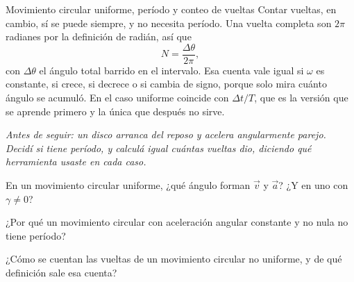 \documentclass[11pt,openany]{book}
\begin{document}
\begin{bloque}{Movimiento circular uniforme, período y conteo de vueltas}
Contar vueltas, en cambio, sí se puede siempre, y no necesita período. Una vuelta completa son $2\pi$ radianes por la definición de radián, así que
\[
N = \frac{\Delta\theta}{2\pi},
\]
con $\Delta\theta$ el ángulo total barrido en el intervalo. Esa cuenta vale igual si $\omega$ es constante, si crece, si decrece o si cambia de signo, porque solo mira cuánto ángulo se acumuló. En el caso uniforme coincide con $\Delta t/T$, que es la versión que se aprende primero y la única que después no sirve.

\textit{Antes de seguir: un disco arranca del reposo y acelera angularmente parejo. Decidí si tiene período, y calculá igual cuántas vueltas dio, diciendo qué herramienta usaste en cada caso.}
\end{bloque}

\begin{chequeo}
\item En un movimiento circular uniforme, ¿qué ángulo forman $\vec v$ y $\vec a$? ¿Y en uno con $\gamma \neq 0$?
\item ¿Por qué un movimiento circular con aceleración angular constante y no nula no tiene período?
\item ¿Cómo se cuentan las vueltas de un movimiento circular no uniforme, y de qué definición sale esa cuenta?
\end{chequeo}
\end{document}
